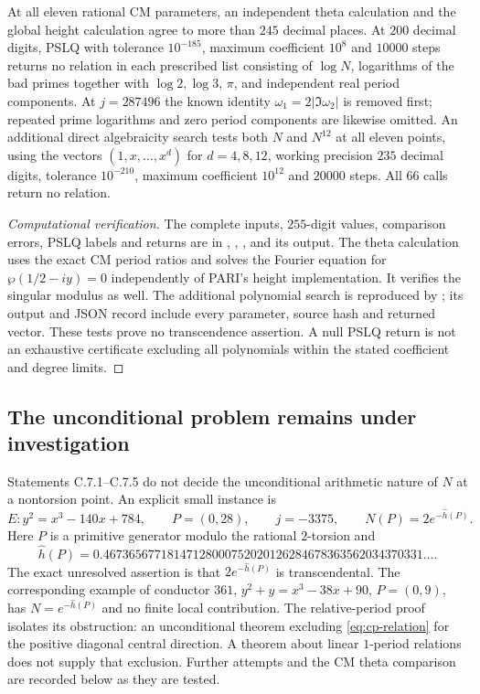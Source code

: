 \begin{statement}
At all eleven rational CM parameters, an independent theta
calculation and the global height calculation agree to more
than $245$ decimal places. At $200$ decimal digits, PSLQ
with tolerance $10^{-185}$, maximum coefficient $10^8$ and
$10000$ steps returns no relation in each prescribed list
consisting of $\log N$, logarithms of the bad primes together
with $\log2,\log3$, $\pi$, and independent real period
components. At $j=287496$ the known identity
$\omega_1=2|\Im\omega_2|$ is removed first; repeated prime
logarithms and zero period components are likewise omitted.
An additional direct algebraicity search tests both $N$ and $N^{12}$
at all eleven points, using the vectors $(1,x,\ldots,x^d)$ for
$d=4,8,12$, working precision $235$ decimal digits, tolerance
$10^{-210}$, maximum coefficient $10^{12}$ and $20000$ steps.
All $66$ calls return no relation.
\end{statement}
\begin{proof}[Computational verification]
The complete inputs, $255$-digit values, comparison errors,
PSLQ labels and returns are in
, ,
, and its output. The theta
calculation uses the exact CM period ratios and solves the
Fourier equation for $\wp(1/2-iy)=0$ independently of PARI's
height implementation. It verifies the singular modulus
as well. The additional polynomial search is reproduced by
; its output and JSON
record include every parameter, source hash and returned vector.
These tests prove no transcendence assertion. A null PSLQ return
is not an exhaustive certificate excluding all polynomials within
the stated coefficient and degree limits.
\end{proof}

\subsection{The unconditional problem remains under investigation}

Statements C.7.1--C.7.5 do not decide the unconditional
arithmetic nature of $N$ at a nontorsion point. An explicit
small instance is
\[
 E:y^2=x^3-140x+784,\qquad P=(0,28),\qquad j=-3375,
 \qquad N(P)=2e^{-\widehat h(P)}.
\]
Here $P$ is a primitive generator modulo the rational
$2$-torsion and
\[
 \widehat h(P)=
 0.46736567718147128000752020126284678363562034370331\ldots.
\]
The exact unresolved assertion is that $2e^{-\widehat h(P)}$
is transcendental. The corresponding example of conductor
$361$, $y^2+y=x^3-38x+90$, $P=(0,9)$, has
$N=e^{-\widehat h(P)}$ and no finite local contribution.
The relative-period proof isolates its obstruction: an
unconditional theorem excluding
\eqref{eq:cp-relation} for the positive diagonal central
direction. A theorem about linear $1$-period relations
does not supply that exclusion. Further attempts and the
CM theta comparison are recorded below as they are tested.
